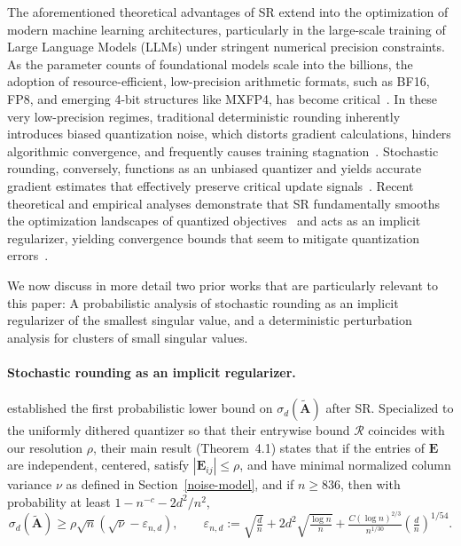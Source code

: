 \documentclass{article}
\newcommand{\Ab}{\mathbf{A}}
\newcommand{\Eb}{\mathbf{E}}
\newcommand{\Abtil}{\tilde{\Ab}}
\newcommand{\rbr}[1]{\left(#1\right)}
\newcommand{\abr}[1]{\left|#1\right|}
\begin{document}
The aforementioned theoretical advantages of SR extend into the optimization of modern machine learning architectures, particularly in the large-scale training of Large Language Models (LLMs) under stringent numerical precision constraints. As the parameter counts of foundational models scale into the billions, the adoption of resource-efficient, low-precision arithmetic formats, such as BF16, FP8, and emerging 4-bit structures like MXFP4, has become critical~\citep{kalamkar2019study,micikevicius2022fp8,mishra2025recipes,tseng2025training}. In these very low-precision regimes, traditional deterministic rounding inherently introduces biased quantization noise, which distorts gradient calculations, hinders algorithmic convergence, and frequently causes training stagnation~\citep{xia2024stochastic}. Stochastic rounding, conversely, functions as an unbiased quantizer and yields accurate gradient estimates that effectively preserve critical update signals~\citep{zhaodirect}. Recent theoretical and empirical analyses demonstrate that SR fundamentally smooths the optimization landscapes of quantized objectives~\citep{kwun2025lotion} and acts as an implicit regularizer, yielding convergence bounds that seem to mitigate quantization errors~\citep{xia2025convergence,ozkara2025stochastic}.

We now discuss in more detail two prior works that are particularly relevant to this paper: A probabilistic analysis of stochastic rounding as an implicit regularizer of the smallest singular value, and a deterministic perturbation analysis for clusters of small singular values.

\paragraph{Stochastic rounding as an implicit regularizer.}
\citet{dexter2025stochastic} established the first probabilistic lower bound on $\sigma_d(\Abtil)$ after SR. Specialized to the uniformly dithered quantizer so that their entrywise bound $\mathcal{R}$ coincides with our resolution $\rho$, their main result (Theorem~4.1) states that if the entries of $\Eb$ are independent, centered, satisfy $\abr{\Eb_{ij}}\le\rho$, and have minimal normalized column variance $\nu$ as defined in Section~\ref{noise-model}, and if $n \ge 836$, then with probability at least $1 - n^{-c} - 2d^2/n^2$,
\begin{equation}\label{eq:dexter-bound}
    \sigma_d(\Abtil) \ge \rho\sqrt{n}\rbr{\sqrt{\nu} - \varepsilon_{n,d}}, \qquad \varepsilon_{n,d} := \sqrt{\tfrac{d}{n}} + 2d^2\sqrt{\tfrac{\log n}{n}} + \tfrac{C(\log n)^{2/3}}{n^{1/30}}\rbr{\tfrac{d}{n}}^{1/54}.
\end{equation}
\end{document}

